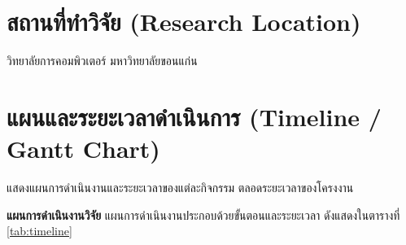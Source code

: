 \documentclass[20pt,a4paper]{article}
\begin{document}

\section{สถานที่ทำวิจัย (Research Location)}

วิทยาลัยการคอมพิวเตอร์ มหาวิทยาลัยขอนแก่น


\section{แผนและระยะเวลาดำเนินการ
(Timeline / Gantt Chart)}

แสดงแผนการดำเนินงานและระยะเวลาของแต่ละกิจกรรม
ตลอดระยะเวลาของโครงงาน

\textbf{แผนการดำเนินงานวิจัย}
แผนการดำเนินงานประกอบด้วยขั้นตอนและระยะเวลา
ดังแสดงในตารางที่ \ref{tab:timeline}
\end{document}
